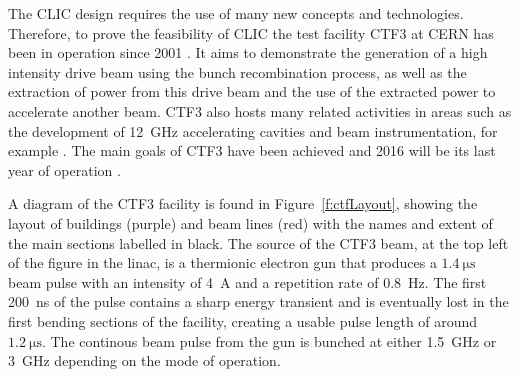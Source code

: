 
The CLIC design requires the use of many new concepts and technologies. Therefore, to prove the feasibility of CLIC the test facility CTF3 at CERN has been in operation since 2001 \cite{CTF3}. It aims to demonstrate the generation of a high intensity drive beam using the bunch recombination process, as well as the extraction of power from this drive beam and the use of the extracted power to accelerate another beam. CTF3 also hosts many related activities in areas such as the development of 12~GHz accelerating cavities and beam instrumentation, for example \cite{ctf2015Status}. The main goals of CTF3 have been achieved and 2016 will be its last year of operation \cite{ctf2016Plan}.

A diagram of the CTF3 facility is found in Figure~\ref{f:ctfLayout},  showing the layout of buildings (purple) and beam lines (red) with the names and extent of the main sections labelled in black. The source of the CTF3 beam, at the top left of the figure in the linac, is a thermionic electron gun \cite{thermionic} that produces a \(1.4~\mathrm{\mu s}\) beam pulse with an intensity of 4~A and a repetition rate of 0.8~Hz. The first 200~ns of the pulse contains a sharp energy transient and is eventually lost in the first bending sections of the facility, creating a usable pulse length of around \(1.2~\mathrm{\mu s}\). The continous beam pulse from the gun is bunched at either 1.5~GHz or 3~GHz depending on the mode of operation.


